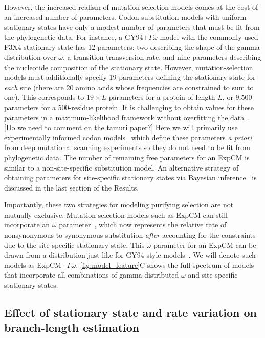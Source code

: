 \documentclass[11pt]{article}
\newcommand\skhcomment[1]{{\color{cyan}[#1]}}
\begin{document}
However, the increased realism of mutation-selection models comes at the cost of an increased number of parameters. 
Codon substitution models with uniform stationary states have only a modest number of parameters that must be fit from the phylogenetic data.
For instance, a GY94+$\Gamma\omega$ model with the commonly used F3X4 stationary state has 12 parameters: two describing the shape of the gamma distribution over $\omega$, a transition-transversion rate, and nine parameters describing the nucleotide composition of the stationary state.
However, mutation-selection models must additionally specify 19 parameters defining the stationary state for \emph{each} site (there are 20 amino acids whose frequencies are constrained to sum to one).
This corresponds to $19\times L$ parameters for a protein of length $L$, or 9,500 parameters for a 500-residue protein.
It is challenging to obtain values for these parameters in a maximum-likelihood framework without overfitting the data~\citep{rodrigue2013statistical}.
\skhcomment{Do we need to comment on the tamuri paper?}
Here we will primarily use experimentally informed codon models~\citep[ExpCM's, \ref{eq:ExpCM};][]{bloom2014experimentally, hilton2017phydms, bloom2017identification} which define these parameters \textit{a priori} from deep mutational scanning experiments so they do not need to be fit from phylogenetic data.
The number of remaining free parameters for an ExpCM is similar to a non-site-specific substitution model.
An alternative strategy of obtaining parameters for site-specific stationary states via Bayesian inference~\citep{lartillot2004bayesian, rodrigue2014site} is discussed in the last section of the Results.

Importantly, these two strategies for modeling purifying selection are not mutually exclusive.
Mutation-selection models such as ExpCM can still incorporate an $\omega$ parameter~\citep{rodrigue2016detecting, bloom2017identification}, which now represents the relative rate of nonsynonymous to synonymous substitution \emph{after} accounting for the constraints due to the site-specific stationary state.
This $\omega$ parameter for an ExpCM can be drawn from a distribution just like for GY94-style models~\citep{haddox2017mapping, rodrigue2014site}. 
We will denote such models as ExpCM+$\Gamma\omega$.
\ref{fig:model_feature}C shows the full spectrum of models that incorporate all combinations of gamma-distributed $\omega$ and site-specific stationary states.

\subsection*{Effect of stationary state and rate variation on branch-length estimation}
\end{document}
